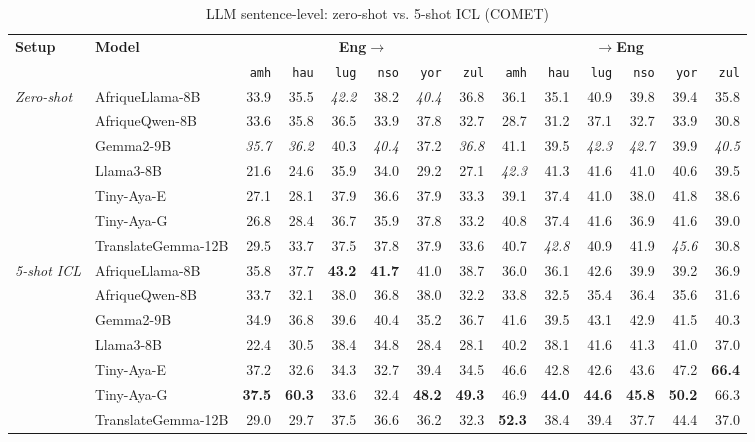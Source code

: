 \begin{table}[t]
\centering
\small
\renewcommand{\arraystretch}{1.05}
\begin{tabular}{llrrrrrrrrrrrr}
\toprule
\textbf{Setup} & \textbf{Model} & \multicolumn{6}{c}{\textbf{Eng$\to$}} & \multicolumn{6}{c}{\textbf{$\to$Eng}} \\
\cmidrule(lr){3-8}\cmidrule(lr){9-14}
  &   & \texttt{amh} & \texttt{hau} & \texttt{lug} & \texttt{nso} & \texttt{yor} & \texttt{zul} & \texttt{amh} & \texttt{hau} & \texttt{lug} & \texttt{nso} & \texttt{yor} & \texttt{zul} \\
\midrule
\multirow{7}{*}{\textit{Zero-shot}} & AfriqueLlama-8B & 33.9 & 35.5 & \emph{42.2} & 38.2 & \emph{40.4} & 36.8 & 36.1 & 35.1 & 40.9 & 39.8 & 39.4 & 35.8 \\
 & AfriqueQwen-8B & 33.6 & 35.8 & 36.5 & 33.9 & 37.8 & 32.7 & 28.7 & 31.2 & 37.1 & 32.7 & 33.9 & 30.8 \\
 & Gemma2-9B & \emph{35.7} & \emph{36.2} & 40.3 & \emph{40.4} & 37.2 & \emph{36.8} & 41.1 & 39.5 & \emph{42.3} & \emph{42.7} & 39.9 & \emph{40.5} \\
 & Llama3-8B & 21.6 & 24.6 & 35.9 & 34.0 & 29.2 & 27.1 & \emph{42.3} & 41.3 & 41.6 & 41.0 & 40.6 & 39.5 \\
 & Tiny-Aya-E & 27.1 & 28.1 & 37.9 & 36.6 & 37.9 & 33.3 & 39.1 & 37.4 & 41.0 & 38.0 & 41.8 & 38.6 \\
 & Tiny-Aya-G & 26.8 & 28.4 & 36.7 & 35.9 & 37.8 & 33.2 & 40.8 & 37.4 & 41.6 & 36.9 & 41.6 & 39.0 \\
 & TranslateGemma-12B & 29.5 & 33.7 & 37.5 & 37.8 & 37.9 & 33.6 & 40.7 & \emph{42.8} & 40.9 & 41.9 & \emph{45.6} & 30.8 \\
\midrule
\multirow{7}{*}{\textit{5-shot ICL}} & AfriqueLlama-8B & 35.8 & 37.7 & \textbf{43.2} & \textbf{41.7} & 41.0 & 38.7 & 36.0 & 36.1 & 42.6 & 39.9 & 39.2 & 36.9 \\
 & AfriqueQwen-8B & 33.7 & 32.1 & 38.0 & 36.8 & 38.0 & 32.2 & 33.8 & 32.5 & 35.4 & 36.4 & 35.6 & 31.6 \\
 & Gemma2-9B & 34.9 & 36.8 & 39.6 & 40.4 & 35.2 & 36.7 & 41.6 & 39.5 & 43.1 & 42.9 & 41.5 & 40.3 \\
 & Llama3-8B & 22.4 & 30.5 & 38.4 & 34.8 & 28.4 & 28.1 & 40.2 & 38.1 & 41.6 & 41.3 & 41.0 & 37.0 \\
 & Tiny-Aya-E & 37.2 & 32.6 & 34.3 & 32.7 & 39.4 & 34.5 & 46.6 & 42.8 & 42.6 & 43.6 & 47.2 & \textbf{66.4} \\
 & Tiny-Aya-G & \textbf{37.5} & \textbf{60.3} & 33.6 & 32.4 & \textbf{48.2} & \textbf{49.3} & 46.9 & \textbf{44.0} & \textbf{44.6} & \textbf{45.8} & \textbf{50.2} & 66.3 \\
 & TranslateGemma-12B & 29.0 & 29.7 & 37.5 & 36.6 & 36.2 & 32.3 & \textbf{52.3} & 38.4 & 39.4 & 37.7 & 44.4 & 37.0 \\
\bottomrule
\end{tabular}
\caption{LLM sentence-level: zero-shot vs. 5-shot ICL (COMET)}
\label{tab:llm_sentence_comet}
\end{table}
